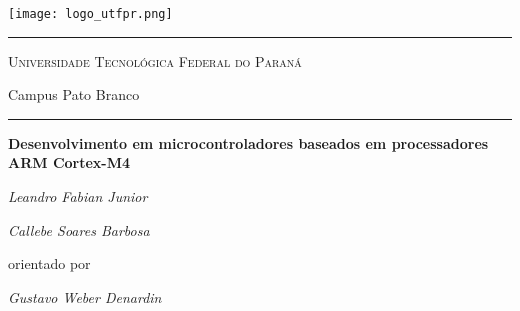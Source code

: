 \documentclass[a4paper,10pt,oneside]{book}
\begin{document}

\begin{titlepage}
	\centering
\texttt{[image: logo\_utfpr.png]}\par\vspace{10pt}
\rule{\textwidth}{1pt}
{\scshape \LARGE Universidade Tecnológica Federal do Paraná\par\vspace{5pt} \Large Campus Pato Branco}
	\rule{\textwidth}{1pt}
	\vfill
	{\huge\bfseries Desenvolvimento em microcontroladores baseados em processadores ARM Cortex-M4\par}
	\vfill
	\begin{minipage}{\textwidth}
		\centering
		\Large\itshape Leandro Fabian Junior\par
		\Large\itshape Callebe Soares Barbosa\par
	\end{minipage}
	\vspace{2cm}
	
	{orientado por\par
	\Large\itshape Gustavo Weber Denardin}

	\vfill


\end{titlepage}
\end{document}
